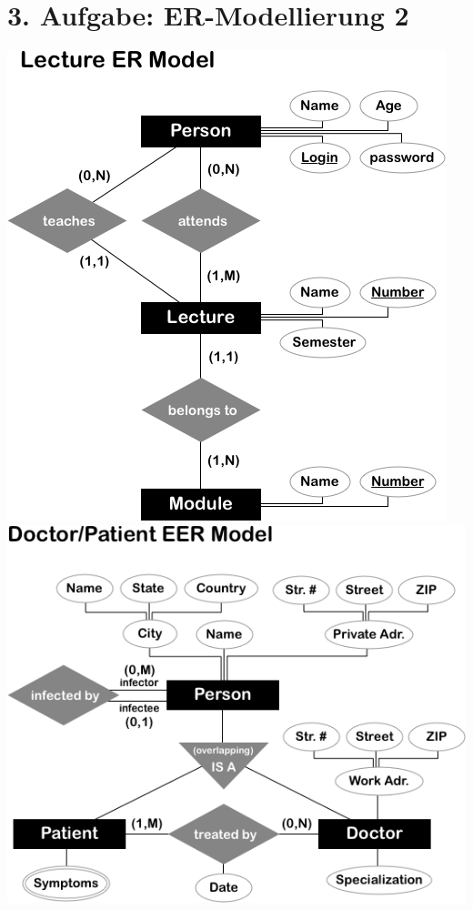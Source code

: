 \documentclass[12pt]{report}
\begin{document}
\section*{3. Aufgabe: ER-Modellierung 2}
\vspace{2cm}
\includegraphics[scale = 0.7]{Q3a}
\newpage
\includegraphics[scale = 0.7]{Q3b}
\vspace{2cm}
\end{document}
